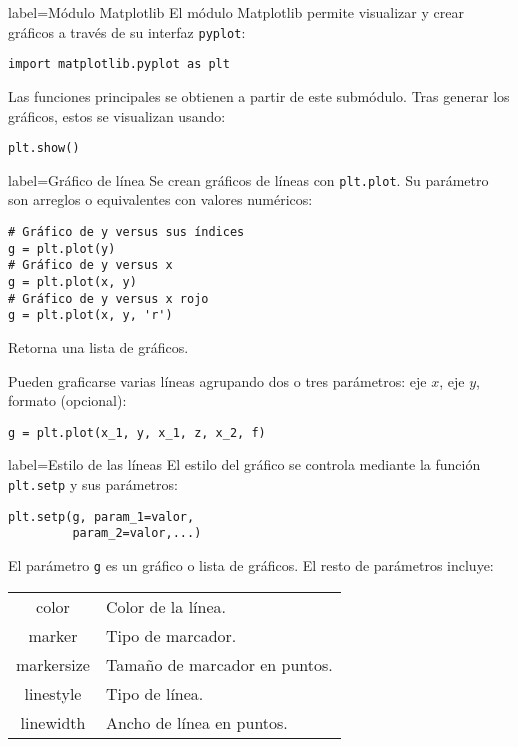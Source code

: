\begin{contentbox}{label=Módulo Matplotlib}
    El módulo Matplotlib permite visualizar y crear gráficos a través de su interfaz \texttt{pyplot}:
    
\begin{lstlisting}
import matplotlib.pyplot as plt
\end{lstlisting}

    Las funciones principales se obtienen a partir de este submódulo. Tras generar los gráficos, estos se visualizan usando:
\begin{lstlisting}
plt.show()
\end{lstlisting}
\end{contentbox}

\begin{contentbox}{label=Gráfico de línea}
    Se crean gráficos de líneas con \lstinline!plt.plot!. Su parámetro son arreglos o equivalentes con valores numéricos:
    
\begin{lstlisting}
# Gráfico de y versus sus índices
g = plt.plot(y)
# Gráfico de y versus x
g = plt.plot(x, y)
# Gráfico de y versus x rojo
g = plt.plot(x, y, 'r')
\end{lstlisting}
    
    Retorna una lista de gráficos.
    
    Pueden graficarse varias líneas agrupando dos o tres parámetros: eje $x$, eje $y$, formato (opcional):
\begin{lstlisting}
g = plt.plot(x_1, y, x_1, z, x_2, f)
\end{lstlisting}
\end{contentbox}

\begin{contentbox}{label=Estilo de las líneas}
    El estilo del gráfico se controla mediante la función \lstinline!plt.setp! y sus parámetros:
\begin{lstlisting}
plt.setp(g, param_1=valor,
         param_2=valor,...)
\end{lstlisting}
    El parámetro \lstinline!g! es un gráfico o lista de gráficos. El resto de parámetros incluye:
    
    \begin{tabular}{C|p{0.5\textwidth}}
        color & Color de la línea. \\
        marker & Tipo de marcador. \\
        markersize & Tamaño de marcador en puntos. \\
        linestyle & Tipo de línea. \\
        linewidth & Ancho de línea en puntos.
    \end{tabular}

\end{contentbox}

